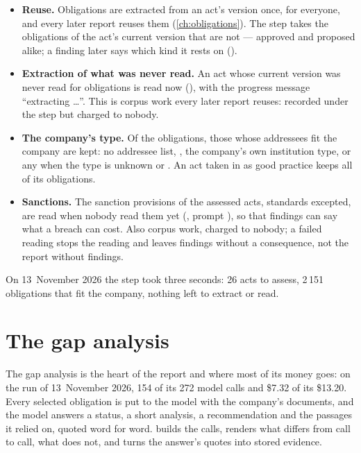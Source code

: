 \begin{itemize}
  \item \textbf{Reuse.} Obligations are extracted from an act's version once, for everyone, and
    every later report reuses them (\cref{ch:obligations}). The step takes the obligations of
    the act's current version that are not  --- approved and proposed alike;
    a finding later says which kind it rests on ().
  \item \textbf{Extraction of what was never read.} An act whose current version was never
    read for obligations is read now (), with the progress message
    \enquote{extracting \ldots}. This is corpus work every later report reuses: recorded under the
    step but charged to nobody.
  \item \textbf{The company's type.} Of the obligations, those whose addressees fit the company
    are kept: no addressee list, , the company's own institution type, or any when
    the type is unknown or . An act taken in as good practice keeps all
    of its obligations.
  \item \textbf{Sanctions.} The sanction provisions of the assessed acts, standards excepted,
    are read when nobody read them yet (, prompt
    ), so that findings can say what a breach can cost. Also corpus
    work, charged to nobody; a failed reading stops the reading and leaves findings without a
    consequence, not the report without findings.
\end{itemize}

On 13~November 2026 the step took three seconds: 26 acts to assess, 2\,151 obligations that
fit the company, nothing left to extract or read.


\section{The gap analysis}\label{sec:report:gap}

The gap analysis is the heart of the report and where most of its money goes: on the run of
13~November 2026, 154 of its 272 model calls and \$7.32 of its \$13.20. Every selected
obligation is put to the model with the company's documents, and the model answers a status, a
short analysis, a recommendation and the passages it relied on, quoted word for word.
 builds the calls,  renders what differs from call to
call,  what does not, and  turns the answer's
quotes into stored evidence.

